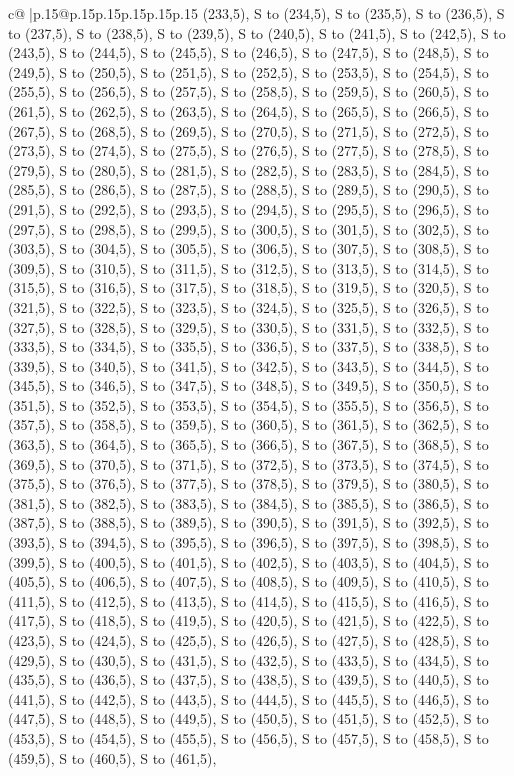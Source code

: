 \documentclass{article}
\begin{document}
{\begin{supertabular}{c@{$\;$}|p{.15\linewidth}@{}p{.15\linewidth}p{.15\linewidth}p{.15\linewidth}p{.15\linewidth}p{.15\linewidth}}
{{{(233,5), S to (234,5), S to (235,5), S to (236,5), S to (237,5), S to (238,5), S to (239,5), S to (240,5), S to (241,5), S to (242,5), S to (243,5), S to (244,5), S to (245,5), S to (246,5), S to (247,5), S to (248,5), S to (249,5), S to (250,5), S to (251,5), S to (252,5), S to (253,5), S to (254,5), S to (255,5), S to (256,5), S to (257,5), S to (258,5), S to (259,5), S to (260,5), S to (261,5), S to (262,5), S to (263,5), S to (264,5), S to (265,5), S to (266,5), S to (267,5), S to (268,5), S to (269,5), S to (270,5), S to (271,5), S to (272,5), S to (273,5), S to (274,5), S to (275,5), S to (276,5), S to (277,5), S to (278,5), S to (279,5), S to (280,5), S to (281,5), S to (282,5), S to (283,5), S to (284,5), S to (285,5), S to (286,5), S to (287,5), S to (288,5), S to (289,5), S to (290,5), S to (291,5), S to (292,5), S to (293,5), S to (294,5), S to (295,5), S to (296,5), S to (297,5), S to (298,5), S to (299,5), S to (300,5), S to (301,5), S to (302,5), S to (303,5), S to (304,5), S to (305,5), S to (306,5), S to (307,5), S to (308,5), S to (309,5), S to (310,5), S to (311,5), S to (312,5), S to (313,5), S to (314,5), S to (315,5), S to (316,5), S to (317,5), S to (318,5), S to (319,5), S to (320,5), S to (321,5), S to (322,5), S to (323,5), S to (324,5), S to (325,5), S to (326,5), S to (327,5), S to (328,5), S to (329,5), S to (330,5), S to (331,5), S to (332,5), S to (333,5), S to (334,5), S to (335,5), S to (336,5), S to (337,5), S to (338,5), S to (339,5), S to (340,5), S to (341,5), S to (342,5), S to (343,5), S to (344,5), S to (345,5), S to (346,5), S to (347,5), S to (348,5), S to (349,5), S to (350,5), S to (351,5), S to (352,5), S to (353,5), S to (354,5), S to (355,5), S to (356,5), S to (357,5), S to (358,5), S to (359,5), S to (360,5), S to (361,5), S to (362,5), S to (363,5), S to (364,5), S to (365,5), S to (366,5), S to (367,5), S to (368,5), S to (369,5), S to (370,5), S to (371,5), S to (372,5), S to (373,5), S to (374,5), S to (375,5), S to (376,5), S to (377,5), S to (378,5), S to (379,5), S to (380,5), S to (381,5), S to (382,5), S to (383,5), S to (384,5), S to (385,5), S to (386,5), S to (387,5), S to (388,5), S to (389,5), S to (390,5), S to (391,5), S to (392,5), S to (393,5), S to (394,5), S to (395,5), S to (396,5), S to (397,5), S to (398,5), S to (399,5), S to (400,5), S to (401,5), S to (402,5), S to (403,5), S to (404,5), S to (405,5), S to (406,5), S to (407,5), S to (408,5), S to (409,5), S to (410,5), S to (411,5), S to (412,5), S to (413,5), S to (414,5), S to (415,5), S to (416,5), S to (417,5), S to (418,5), S to (419,5), S to (420,5), S to (421,5), S to (422,5), S to (423,5), S to (424,5), S to (425,5), S to (426,5), S to (427,5), S to (428,5), S to (429,5), S to (430,5), S to (431,5), S to (432,5), S to (433,5), S to (434,5), S to (435,5), S to (436,5), S to (437,5), S to (438,5), S to (439,5), S to (440,5), S to (441,5), S to (442,5), S to (443,5), S to (444,5), S to (445,5), S to (446,5), S to (447,5), S to (448,5), S to (449,5), S to (450,5), S to (451,5), S to (452,5), S to (453,5), S to (454,5), S to (455,5), S to (456,5), S to (457,5), S to (458,5), S to (459,5), S to (460,5), S to (461,5), }}}
\end{supertabular}}
\end{document}
